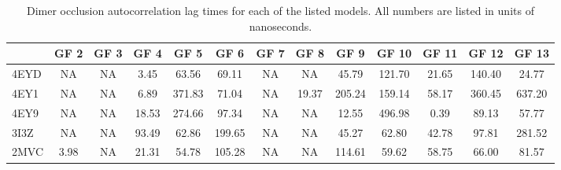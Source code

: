 \documentclass[9pt]{elife}
\begin{document}
\renewcommand{\thetable}{S\arabic{table}}
\begin{table}[H]
\centering
\begin{adjustbox}{width=1.0\textwidth,center=\textwidth}
\begin{tabular}{|l| c| c| c| c| c| c| c| c| c| c| c| c|}
\hline
&GF 2&GF 3&GF 4&GF 5&GF 6&GF 7&GF 8&GF 9&GF 10&GF 11&GF 12&GF 13\\ \hline
4EYD&NA& NA&3.45&63.56&69.11& NA& NA&45.79&121.70&21.65&140.40&24.77 \\ \hline
4EY1&NA& NA&6.89&371.83&71.04& NA&19.37&205.24&159.14&58.17&360.45&637.20 \\ \hline
4EY9&NA & NA &18.53&274.66&97.34& NA &NA &12.55&496.98&0.39&89.13&57.77 \\ \hline
3I3Z&NA & NA &93.49&62.86&199.65& NA & NA &45.27&62.80&42.78&97.81&281.52 \\ \hline
2MVC&3.98&NA &21.31&54.78&105.28&NA &NA &114.61&59.62&58.75&66.00&81.57 \\ \hline
\end{tabular}
\end{adjustbox}
\caption{Dimer occlusion autocorrelation lag times for each of the listed models. All numbers are listed in units of nanoseconds.}
\label{supple_tab: occlusion_lag}
\end{table}
\end{document}
